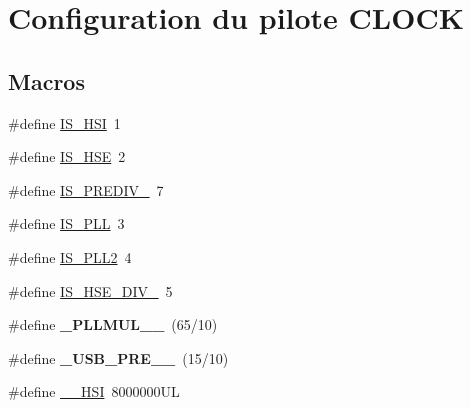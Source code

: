 \hypertarget{group__conf___c_l_o_c_k}{\section{Configuration du pilote C\+L\+O\+C\+K}
\label{group__conf___c_l_o_c_k}
}
\subsection*{Macros}
\begin{DoxyCompactItemize}
\item 
\#define \hyperlink{group__conf___c_l_o_c_k_gaa1425fce5bac8350e2064989025aa082}{I\+S\+\_\+\+H\+S\+I}~1
\item 
\#define \hyperlink{group__conf___c_l_o_c_k_gab0b6fc706cd43ac49946f4d5c66a8eb1}{I\+S\+\_\+\+H\+S\+E}~2
\item 
\#define \hyperlink{group__conf___c_l_o_c_k_ga0242e7a973a1530936ec981855fcae5f}{I\+S\+\_\+\+P\+R\+E\+D\+I\+V\+\_}~7
\item 
\#define \hyperlink{group__conf___c_l_o_c_k_gaaed0ce9b11c552da90ac1cffd3f7c3fb}{I\+S\+\_\+\+P\+L\+L}~3
\item 
\#define \hyperlink{group__conf___c_l_o_c_k_ga114515a7f91fdd8eff2ecb36cb8813f7}{I\+S\+\_\+\+P\+L\+L2}~4
\item 
\#define \hyperlink{group__conf___c_l_o_c_k_gaee88dba21d1388c0107ec6375eb3fe9c}{I\+S\+\_\+\+H\+S\+E\+\_\+\+D\+I\+V\+\_}~5
\item 
\hypertarget{group__conf___c_l_o_c_k_gacab6d04b5fd9fa1c7f85a89d2abfa9ac}{\#define {\bfseries \+\_\+\+P\+L\+L\+M\+U\+L\+\_\+\_}~(65/10)}\label{group__conf___c_l_o_c_k_gacab6d04b5fd9fa1c7f85a89d2abfa9ac}

\item 
\hypertarget{group__conf___c_l_o_c_k_gacee707f661b47fe9e0744854d9ead0b2}{\#define {\bfseries \+\_\+\+U\+S\+B\+\_\+\+P\+R\+E\+\_\+\_}~(15/10)}\label{group__conf___c_l_o_c_k_gacee707f661b47fe9e0744854d9ead0b2}

\item 
\hypertarget{group__conf___c_l_o_c_k_gabbd628d8a30e6695b3715ae72a693e56}{\#define \hyperlink{group__conf___c_l_o_c_k_gabbd628d8a30e6695b3715ae72a693e56}{\+\_\+\+\_\+\+H\+S\+I}~8000000\+U\+L}\label{group__conf___c_l_o_c_k_gabbd628d8a30e6695b3715ae72a693e56}


\end{DoxyCompactItemize}
